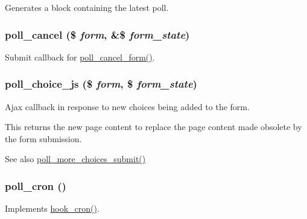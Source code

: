 Generates a block containing the latest poll. \hypertarget{poll_8module_aa61fb956921bdbfc96b8bc5de349909f}{
\subsubsection[{poll\_\-cancel}]{\setlength{\rightskip}{0pt plus 5cm}poll\_\-cancel (\$ {\em form}, \/  \&\$ {\em form\_\-state})}}
\label{poll_8module_aa61fb956921bdbfc96b8bc5de349909f}
Submit callback for \hyperlink{group__forms_ga15cf9694bfdb20243340a8c7168d441c}{poll\_\-cancel\_\-form()}. \hypertarget{poll_8module_a31f17036375b3e47f128839d9c4b11b9}{
\subsubsection[{poll\_\-choice\_\-js}]{\setlength{\rightskip}{0pt plus 5cm}poll\_\-choice\_\-js (\$ {\em form}, \/  \$ {\em form\_\-state})}}
\label{poll_8module_a31f17036375b3e47f128839d9c4b11b9}
Ajax callback in response to new choices being added to the form.

This returns the new page content to replace the page content made obsolete by the form submission.

\begin{DoxySeeAlso}{See also}
\hyperlink{poll_8module_ae339bb6acfe80a22326439034dd04a4c}{poll\_\-more\_\-choices\_\-submit()} 
\end{DoxySeeAlso}
\hypertarget{poll_8module_aa409a9bf9aea33408f80359e06217fd9}{
\subsubsection[{poll\_\-cron}]{\setlength{\rightskip}{0pt plus 5cm}poll\_\-cron ()}}
\label{poll_8module_aa409a9bf9aea33408f80359e06217fd9}
Implements \hyperlink{group__hooks_gaf07f1e3d98112fc2ba6920cf7ee6fb16}{hook\_\-cron()}.

